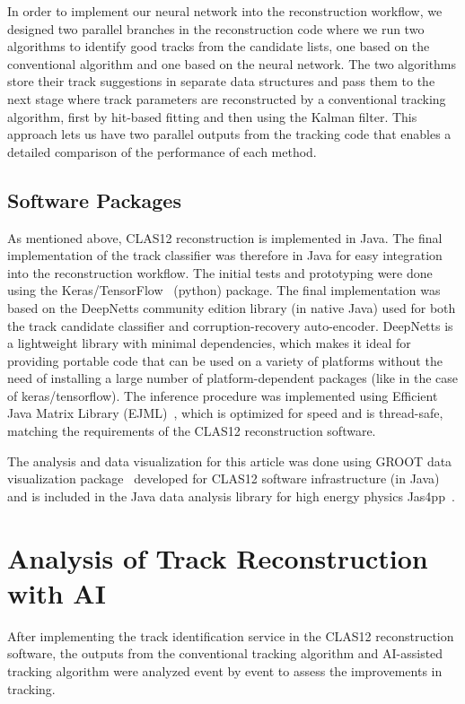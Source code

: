 \documentclass[aps,prl,preprint,12pt]{revtex4}
\begin{document}
In order to implement our neural network into the reconstruction workflow, we designed two parallel 
branches in the reconstruction code where we run two algorithms to identify good tracks from the 
candidate lists, one based on the conventional algorithm and one based on the neural network. The two 
algorithms store their track suggestions in separate data structures and pass them to the next stage where 
track parameters are reconstructed by a conventional tracking algorithm, first by hit-based fitting and then 
using the Kalman filter. This approach lets us have two parallel outputs from the tracking code that enables 
a detailed comparison of the performance of each method.

\subsection{Software Packages}

As mentioned above, CLAS12 reconstruction is implemented in Java. The final implementation of the  
track classifier was therefore in Java for easy integration into the reconstruction workflow. The initial tests 
and prototyping were done using the Keras/TensorFlow~\cite{keras-website} (python) package. The final 
implementation was based on the DeepNetts \cite{Sevarac.Z} community edition library (in native Java) 
used for both the track candidate classifier and corruption-recovery auto-encoder. DeepNetts is a lightweight
 library with minimal dependencies, which makes it ideal for providing portable code that can be used on a variety 
 of platforms without the need of installing a large number of platform-dependent packages (like in the case of
  keras/tensorflow). The inference procedure was implemented using Efficient Java Matrix Library (EJML)~\cite{ejml:2021}, 
  which is optimized for speed and is thread-safe, matching the requirements of the CLAS12 reconstruction software.

The analysis and data visualization for this article was done using GROOT data visualization package~\cite{groot-github} 
developed for CLAS12 software infrastructure (in Java) and is included in the Java data analysis library for high energy 
physics Jas4pp~\cite{Chekanov:2020bja}.

\section{Analysis of Track Reconstruction with AI}

After implementing the track identification service in the CLAS12 
reconstruction software, the outputs from the conventional tracking 
algorithm and AI-assisted tracking algorithm were analyzed event by 
event to assess the improvements in tracking. 
 
\end{document}
